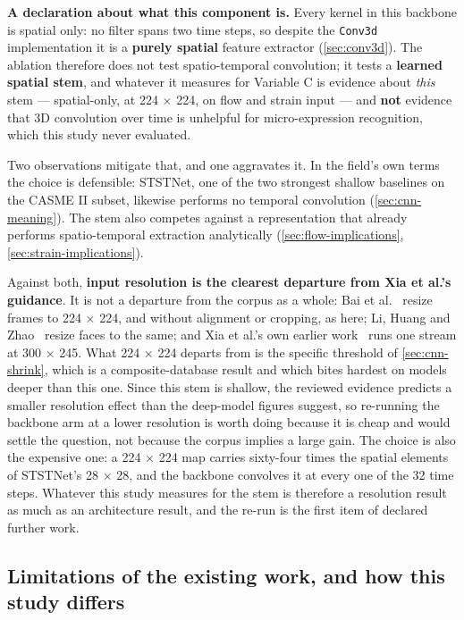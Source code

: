 \textbf{A declaration about what this component is.} Every kernel in this backbone is spatial only: no filter spans two time steps, so despite the \texttt{Conv3d} implementation it is a \textbf{purely spatial} feature extractor (\autoref{sec:conv3d}). The ablation therefore does not test spatio-temporal convolution; it tests a \textbf{learned spatial stem}, and whatever it measures for Variable C is evidence about \textit{this} stem --- spatial-only, at 224 $\times$ 224, on flow and strain input --- and \textbf{not} evidence that 3D convolution over time is unhelpful for micro-expression recognition, which this study never evaluated.

Two observations mitigate that, and one aggravates it. In the field's own terms the choice is defensible: STSTNet, one of the two strongest shallow baselines on the CASME II subset, likewise performs no temporal convolution (\autoref{sec:cnn-meaning}). The stem also competes against a representation that already performs spatio-temporal extraction analytically (\autoref{sec:flow-implications}, \autoref{sec:strain-implications}).

Against both, \textbf{input resolution is the clearest departure from Xia et al.'s guidance}. It is not a departure from the corpus as a whole: Bai et al.~\cite{bai2021} resize frames to 224 $\times$ 224, and without alignment or cropping, as here; Li, Huang and Zhao~\cite{liY2021} resize faces to the same; and Xia et al.'s own earlier work~\cite{xia2020a} runs one stream at 300 $\times$ 245. What 224 $\times$ 224 departs from is the specific threshold of \autoref{sec:cnn-shrink}, which is a composite-database result and which bites hardest on models deeper than this one. Since this stem is shallow, the reviewed evidence predicts a smaller resolution effect than the deep-model figures suggest, so re-running the backbone arm at a lower resolution is worth doing because it is cheap and would settle the question, not because the corpus implies a large gain. The choice is also the expensive one: a 224 $\times$ 224 map carries sixty-four times the spatial elements of STSTNet's 28 $\times$ 28, and the backbone convolves it at every one of the 32 time steps. Whatever this study measures for the stem is therefore a resolution result as much as an architecture result, and the re-run is the first item of declared further work.

\subsection{Limitations of the existing work, and how this study differs}
\label{sec:cnn-gap}

